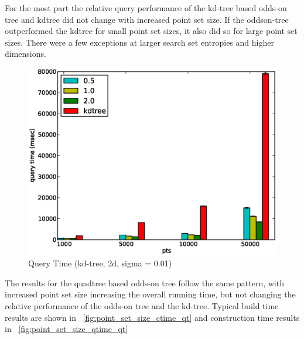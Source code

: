 \documentclass[mcs]{scsthesis}
\begin{document}
For the most part the relative query performance of the kd-tree based odds-on
tree and kdtree did not change with increased point set size. If the oddson-tree
outperformed the kdtree for small point set sizes, it also did so for large
point set sizes. There were a few exceptions at larger search set entropies and
higher dimensions.

\begin{figure}
\begin{center}
\includegraphics[scale=0.5]{diagrams/2d_group_bypts_sigma0.01_qtime.eps}
\caption{Query Time (kd-tree, 2d, sigma = 0.01)}
\label{fig:point_set_size_qtime}
\end{center}
\end{figure}

The results for the quadtree based odds-on tree follow the same pattern, with
increased point set size increasing the overall running time, but not changing
the relative performance of the odds-on tree and the kd-tree. Typical build
time results are shown in ~\ref{fig:point_set_size_ctime_qt} and construction
time results in ~\ref{fig:point_set_size_qtime_qt}  
\end{document}
